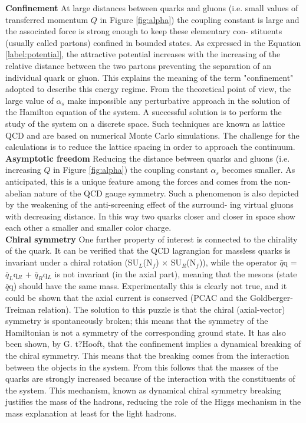 \textbf{Confinement}
At large distances between quarks and gluons (i.e. small values of transferred momentum $Q$ in Figure \ref{fig:alpha}) the coupling constant is large and the associated force is strong enough to keep these elementary con- stituents (usually called partons) confined in bounded states. As expressed in the Equation \ref{label:potential}, the attractive potential increases with the increasing of the relative distance between the two partons preventing the separation of an individual quark or gluon. This explains the meaning of the term "confinement" adopted to describe this energy regime. From the theoretical point of view, the large value of $\alpha_{s}$ make impossible any perturbative approach in the solution of the Hamilton equation of the system. A successful solution is to perform the study of the system on a discrete space. Such techniques are known as lattice QCD and are based on numerical Monte Carlo simulations. The challenge for the calculations is to reduce the lattice spacing in order to approach the continuum.\\

\textbf{Asymptotic freedom}
Reducing the distance between quarks and gluons (i.e. increasing $Q$ in Figure \ref{fig:alpha}) the coupling constant $\alpha_{s}$ becomes smaller. As anticipated, this is a unique feature among the forces and comes from the non-abelian nature of the QCD gauge symmetry. Such a phenomenon is also depicted by the weakening of the anti-screening effect of the surround- ing virtual gluons with decreasing distance. In this way two quarks closer and closer in space show each other a smaller and smaller color charge. \\


\textbf{Chiral symmetry}
One further property of interest is connected to the chirality of the quark. It can be verified that the QCD lagrangian for massless quarks is invariant under a chiral rotation (SU$_{L}$(N$_{f}$) $\times$ SU$_{R}$(N$_{f}$)), while the operator $\bar{q}$q = $\bar{q}_{L}$q$_{R}$ + $\bar{q}_{R}$q$_{L}$ is not invariant (in the axial part), meaning that the mesons (state $\bar{q}$q) should have the same mass. Experimentally this is clearly not true, and it could be shown that the axial current is conserved (PCAC and the Goldberger-Treiman relation). The solution to this puzzle is that the chiral (axial-vector) symmetry is spontaneously broken; this means that the symmetry of the Hamiltonian is not a symmetry of the corresponding ground state. It has also been shown, by G. t?Hooft, that the confinement implies a dynamical breaking of the chiral symmetry. This means that the breaking comes from the interaction between the objects in the system. From this follows that the masses of the quarks are strongly increased because of the interaction with the constituents of the system. This mechanism, known as dynamical chiral symmetry breaking justifies the mass of the hadrons, reducing the role of the Higgs mechanism in the mass explanation at least for the light hadrons.


